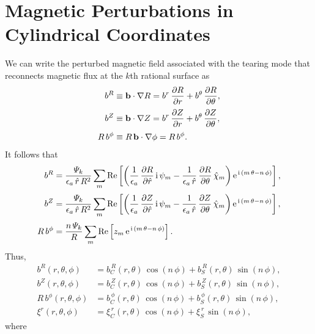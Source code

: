 \documentclass[12pt,prb,aps,notitlepage]{revtex4-1}
\begin{document}
\section{Magnetic Perturbations in Cylindrical Coordinates}
We can write the perturbed magnetic field associated with the tearing mode that reconnects magnetic flux at the $k$th rational surface as
\begin{align}
b^R &\equiv {\bf b}\cdot\nabla R = b^r\,\frac{\partial R}{\partial r}+ b^\theta\,\frac{\partial R}{\partial\theta},\\[0.5ex]
b^Z &\equiv {\bf b}\cdot\nabla Z = b^r\,\frac{\partial Z}{\partial r}+ b^\theta\,\frac{\partial Z}{\partial\theta},\\[0.5ex]
R\,b^\phi&\equiv R\,{\bf b}\cdot\nabla\phi = R\,b^\phi.
\end{align}
It follows that
\begin{align}
b^R&= \frac{{\mit\Psi}_k}{\epsilon_a\,\hat{r}\,R^2}\sum_m{\rm Re}\left[\left(\frac{1}{\epsilon_a}\,\frac{\partial R}{\partial\hat{r}}\,{\rm i}\,\psi_m - \frac{1}{\epsilon_a\,\hat{r}}\,\frac{\partial R}{\partial \theta}\,\hat{\chi}_m\right){\rm e}^{\,{\rm i}\,(m\,\theta-n\,\phi)}\right],\\[0.5ex]
b^Z&= \frac{{\mit\Psi}_k}{\epsilon_a\,\hat{r}\,R^2}\sum_m{\rm Re}\left[\left(\frac{1}{\epsilon_a}\,\frac{\partial Z}{\partial\hat{r}}\,{\rm i}\,\psi_m - \frac{1}{\epsilon_a\,\hat{r}}\,\frac{\partial Z}{\partial \theta}\,\hat{\chi}_m\right){\rm e}^{\,{\rm i}\,(m\,\theta-n\,\phi)}\right],\\[0.5ex]
R\,b^\phi &= \frac{n\,{\mit\Psi}_k}{R}\sum_m {\rm Re}\left[z_m\,{\rm e}^{\,{\rm i}\,(m\,\theta-n\,\phi)}\right].
\end{align}
Thus,
\begin{align}
b^R(r,\theta,\phi) &= b^{\,R}_C(r,\theta)\,\cos(n\,\phi) + b_S^{\,R}(r,\theta)\,\sin(n\,\phi),\\[0.5ex]
b^Z(r,\theta,\phi) &= b^{\,Z}_C(r,\theta)\,\cos(n\,\phi) + b_S^{\,Z}(r,\theta)\,\sin(n\,\phi),\\[0.5ex]
R\,b^\phi(r,\theta,\phi) &= b^{\,\phi}_C(r,\theta)\,\cos(n\,\phi) + b_S^{\,\phi}(r,\theta)\,\sin(n\,\phi),\\[0.5ex]\xi^r(r,\theta,\phi)&= \xi^{\,r}_{C}(r,\theta)\,\cos(n\,\phi) + \xi^{\,r}_{S}\,\sin(n\,\phi),
\end{align}
where
\end{document}
